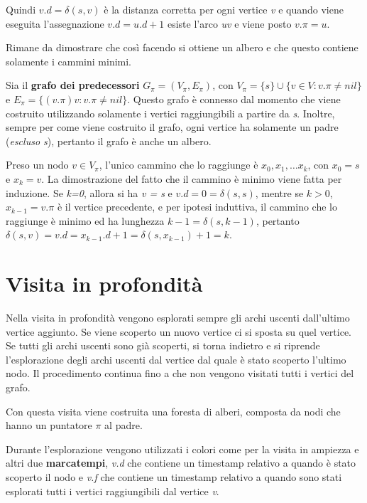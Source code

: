 Quindi $v.d = \delta(s,v)$ è la distanza corretta per ogni vertice
\emph{v} e quando viene eseguita l'assegnazione $v.d = u.d+1$
esiste l'arco \emph{uv} e viene posto $v.\pi = u$.

Rimane da dimostrare che così facendo si ottiene un albero e che questo
contiene solamente i cammini minimi.

Sia il \textbf{grafo dei predecessori} $G_{\pi} = (V_{\pi}, E_{\pi})$, con
$V_{\pi} = \{s\} \cup \{v \in V : v.\pi \neq nil\}$ e $E_{\pi} = \{(v.\pi)v :
v.\pi \neq nil\}$. Questo grafo è connesso dal momento che viene costruito
utilizzando solamente i vertici raggiungibili a partire da \emph{s}.
Inoltre, sempre per come viene costruito il grafo, ogni vertice ha
solamente un padre (\emph{escluso s}), pertanto il grafo è anche un
albero.

Preso un nodo $v \in V_{\pi}$, l'unico cammino che lo raggiunge è
$x_0, x_1, \ldots x_k$, con $x_0 = s$ e $x_k = v$. La
dimostrazione del fatto che il cammino è minimo viene fatta per
induzione. Se \emph{k=0}, allora si ha \emph{v = s} e $v.d = 0 =
\delta(s,s)$, mentre se $k >0$, $x_{k-1} = v.\pi$ è il
vertice precedente, e per ipotesi induttiva, il cammino che lo raggiunge
è minimo ed ha lunghezza $k-1 = \delta(s,k-1)$, pertanto
$\delta(s,v) = v.d = x_{k-1}.d+1 = \delta(s,x_{k-1})+1 = k$.

\section{Visita in profondità}\label{visita-in-profondituxe0}

Nella visita in profondità vengono esplorati sempre gli archi uscenti
dall'ultimo vertice aggiunto. Se viene scoperto un nuovo vertice ci si
sposta su quel vertice. Se tutti gli archi uscenti sono già scoperti,
si torna indietro e si riprende l'esplorazione degli archi uscenti dal
vertice dal quale è stato scoperto l'ultimo nodo. Il procedimento
continua fino a che non vengono visitati tutti i vertici del grafo.

Con questa visita viene costruita una foresta di alberi, composta da
nodi che hanno un puntatore $\pi$ al padre.

Durante l'esplorazione vengono utilizzati i colori come per la visita in
ampiezza e altri due \textbf{marcatempi}, \emph{v.d} che contiene un
timestamp relativo a quando è stato scoperto il nodo e \emph{v.f} che
contiene un timestamp relativo a quando sono stati esplorati tutti i
vertici raggiungibili dal vertice \emph{v}.

